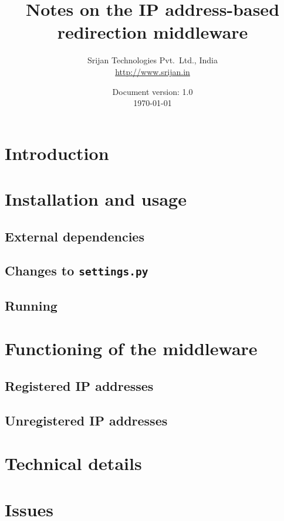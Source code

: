 \documentclass[a4paper]{report}
\newcommand{\revnum}{1.0\xspace}
\newcommand{\settings}{{\tt settings.py}\xspace}
\begin{document}
\begin{titlepage}
  \title{Notes on the IP address-based redirection middleware}
  \author{Srijan Technologies Pvt.~Ltd., India\\\url{http://www.srijan.in}}
  \date{Document version: \revnum\\ \today}
  \maketitle
\end{titlepage}

\setcounter{tocdepth}{2}
\tableofcontents

\setcounter{page}{1}

\chapter{Introduction}


\chapter{Installation and usage}

  \section{External dependencies}
  
  \section{Changes to \settings}
  
  \section{Running}
  

\chapter{Functioning of the middleware}

  \section{Registered IP addresses}
  
  \section{Unregistered IP addresses}
  

\chapter{Technical details}


\chapter{Issues}



\end{document}
